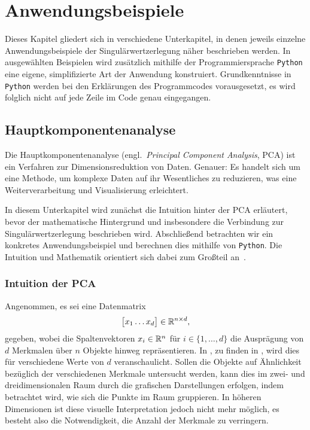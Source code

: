 \chapter{Anwendungsbeispiele}   
Dieses Kapitel gliedert sich in verschiedene Unterkapitel, in denen jeweils einzelne Anwendungsbeispiele der Singulärwertzerlegung näher beschrieben werden.
In ausgewählten Beispielen wird zusätzlich mithilfe der Programmiersprache \texttt{Python} eine eigene, simplifizierte Art der Anwendung konstruiert.
Grundkenntnisse in \texttt{Python} werden bei den Erklärungen des Programmcodes vorausgesetzt, es wird folglich nicht auf jede Zeile im Code genau eingegangen.

\section{Hauptkomponentenanalyse}

Die Hauptkomponentenanalyse (engl.\ \textit{Principal Component Analysis}, PCA) ist ein Verfahren zur Dimensionsreduktion von Daten.
Genauer: Es handelt sich um eine Methode, um komplexe Daten auf ihr Wesentliches zu reduzieren, was eine Weiterverarbeitung und Visualisierung erleichtert.

In diesem Unterkapitel wird zunächst die Intuition hinter der PCA erläutert, bevor der mathematische Hintergrund und insbesondere die Verbindung zur Singulärwertzerlegung beschrieben wird.
Abschließend betrachten wir ein konkretes Anwendungsbeispiel und berechnen dies mithilfe von \texttt{Python}.
Die Intuition und Mathematik orientiert sich dabei zum Großteil an~\cite{ngMachineLearningCS2292023}.

\subsection{Intuition der PCA}
Angenommen, es sei eine Datenmatrix
\begin{equation*}
    \big[
        \begin{matrix}
            x_1 \dots x_d
        \end{matrix}    
    \big] \in \mathbb{R}^{n \times d},
\end{equation*}
gegeben, wobei die Spaltenvektoren \(x_i \in \mathbb{R}^{n}\) für \(i \in \{1,\ldots,d\}\) die Ausprägung von \(d\) Merkmalen über \(n\) Objekte hinweg repräsentieren.
In , zu finden in , wird dies für verschiedene Werte von \(d\) veranschaulicht.
Sollen die Objekte auf Ähnlichkeit bezüglich der verschiedenen Merkmale untersucht werden, kann dies im zwei- und dreidimensionalen Raum durch die grafischen Darstellungen erfolgen, indem betrachtet wird, wie sich die Punkte im Raum gruppieren.
In höheren Dimensionen ist diese visuelle Interpretation jedoch nicht mehr möglich, es besteht also die Notwendigkeit, die Anzahl der Merkmale zu verringern.

